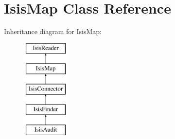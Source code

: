 \hypertarget{classIsisMap}{
\section{IsisMap Class Reference}
\label{classIsisMap}
}
Inheritance diagram for IsisMap:\begin{figure}[H]
\begin{center}
\leavevmode
\includegraphics[height=5.000000cm]{classIsisMap}
\end{center}
\end{figure}
